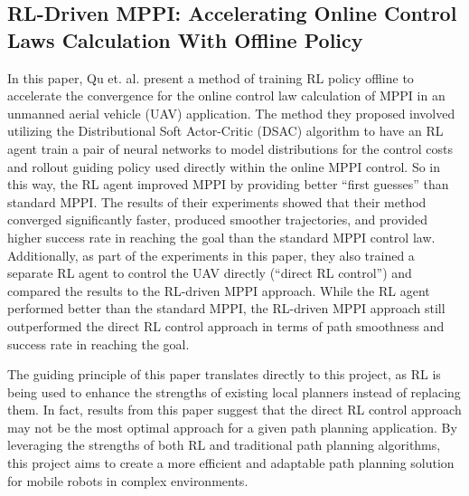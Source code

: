 \documentclass[conference]{IEEEtran}
\begin{document}
        \subsection{RL-Driven MPPI: Accelerating Online Control Laws Calculation With Offline Policy \cite{b3}}
        In this paper, Qu et. al. present a method of training RL policy offline to accelerate the convergence for the online control law calculation of MPPI in an unmanned aerial vehicle (UAV) application. The method they proposed involved utilizing the Distributional Soft Actor-Critic (DSAC) algorithm to have an RL agent train a pair of neural networks to model distributions for the control costs and rollout guiding policy used directly within the online MPPI control. So in this way, the RL agent improved MPPI by providing better ``first guesses'' than standard MPPI. The results of their experiments showed that their method converged significantly faster, produced smoother trajectories, and provided higher success rate in reaching the goal than the standard MPPI control law. Additionally, as part of the experiments in this paper, they also trained a separate RL agent to control the UAV directly (``direct RL control'') and compared the results to the RL-driven MPPI approach. While the RL agent performed better than the standard MPPI, the RL-driven MPPI approach still outperformed the direct RL control approach in terms of path smoothness and success rate in reaching the goal.

        The guiding principle of this paper translates directly to this project, as RL is being used to enhance the strengths of existing local planners instead of replacing them. In fact, results from this paper suggest that the direct RL control approach may not be the most optimal approach for a given path planning application. By leveraging the strengths of both RL and traditional path planning algorithms, this project aims to create a more efficient and adaptable path planning solution for mobile robots in complex environments.
\end{document}
